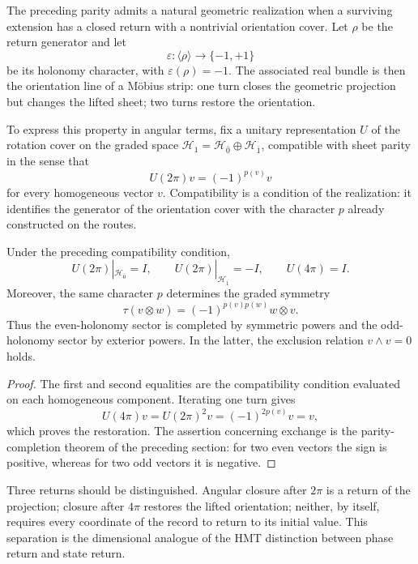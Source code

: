 The preceding parity admits a natural geometric realization when a
surviving extension has a closed return with a nontrivial orientation
cover. Let \(\rho\) be the return generator and let
\[
 \varepsilon:\langle\rho\rangle\longrightarrow\{-1,+1\}
\]
be its holonomy character, with \(\varepsilon(\rho)=-1\). The associated real
bundle is then the orientation line of a Möbius strip: one
turn closes the geometric projection but changes the lifted sheet; two
turns restore the orientation.

To express this property in angular terms, fix a unitary
representation \(U\) of the rotation cover on the graded space
\(\mathcal H_1=\mathcal H_{\bar0}\oplus\mathcal H_{\bar1}\), compatible with
sheet parity in the sense that
\[
 U(2\pi)v=(-1)^{p(v)}v
\]
for every homogeneous vector \(v\). Compatibility is a condition of the
realization: it identifies the generator of the orientation cover with the
character \(p\) already constructed on the routes.

\begin{theorem}
\label{thm:dos-cuatro-pi-estadistica}
Under the preceding compatibility condition,
\[
 U(2\pi)|_{\mathcal H_{\bar0}}=I,
 \qquad
 U(2\pi)|_{\mathcal H_{\bar1}}=-I,
 \qquad
 U(4\pi)=I.
\]
Moreover, the same character \(p\) determines the graded symmetry
\[
 \tau(v\otimes w)=(-1)^{p(v)p(w)}w\otimes v.
\]
Thus the even-holonomy sector is completed by symmetric
powers and the odd-holonomy sector by exterior powers. In
the latter, the exclusion relation \(v\wedge v=0\) holds.
\end{theorem}

\begin{proof}
The first and second equalities are the compatibility condition evaluated
on each homogeneous component. Iterating one turn gives
\[
 U(4\pi)v=U(2\pi)^2v=(-1)^{2p(v)}v=v,
\]
which proves the restoration. The assertion concerning exchange is the
parity-completion theorem of the preceding section: for two even vectors
the sign is positive, whereas for two odd vectors it is negative.
\end{proof}

Three returns should be distinguished. Angular closure after \(2\pi\) is a
return of the projection; closure after \(4\pi\) restores the lifted
orientation; neither, by itself, requires every coordinate of the record
to return to its initial value. This separation is the dimensional analogue of the
HMT distinction between phase return and state return.


